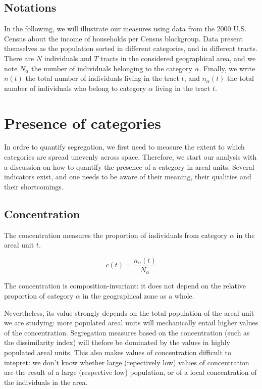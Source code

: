 \subsection{Notations}
\label{sub:notations}

In the following, we will illustrate our measures using data from the $2000$
U.S. Census about the income of households per Census blockgroup. Data present
themselves as the population sorted in different categories, and in different
tracts. There are $N$ individuals and  $T$ tracts in the considered geographical
area, and we note $N_\alpha$ the number of individuals belonging to the category
$\alpha$.  Finally, we write $n(t)$ the total number of individuals living in
the tract $t$, and $n_\alpha(t)$ the total number of individuals who belong to
category $\alpha$ living in the tract $t$.



\section{Presence of categories}
\label{sec:presence_of_categories}

In ordre to quantify segregation, we first need to measure the extent to which
categories are spread unevenly across space. Therefore, we start our analysis
with a discussion on how to quantify the presence of a category in areal units.
Several indicators exist, and one needs to be aware of their meaning, their
qualities and their shortcomings. 


\subsection{Concentration}
\label{sub:concentration}

The concentration measures the proportion of individuals from category $\alpha$
in the areal unit $t$. 

\begin{equation}
    c(t) = \frac{n_\alpha(t)}{N_\alpha}
    \label{eq:concentration}
\end{equation}

The concentration is composition-invariant: it
does not depend on the relative proportion of category $\alpha$ in the
geographical zone as a whole. 

Nevertheless, its value strongly depends on the total population of the areal
unit we are studying: more populated areal units will mechanically entail higher
values of the concentration. Segregation measures based on the concentration
(such as the dissimilarity index) will thefore be dominated by the values in
highly populated areal units. This also makes values of concentration difficult
to intepret: we don't know whether large (repectively low) values of
concentration are the result of a large (respective low) population, or of a
local concentration of the individuals in the area. 


